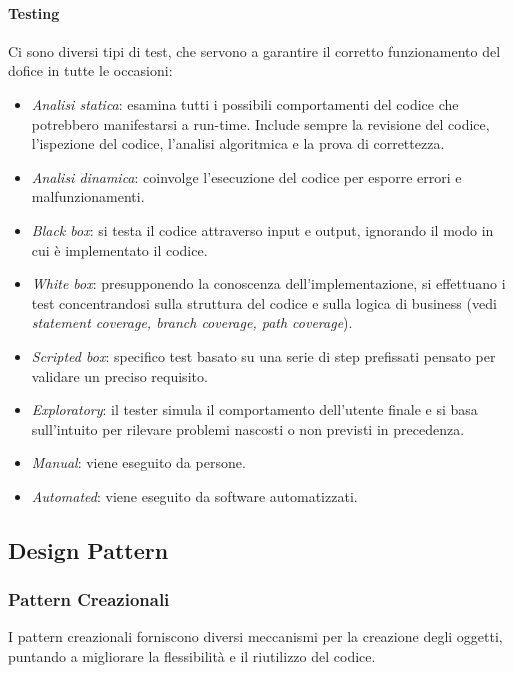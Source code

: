 \documentclass{article}
\begin{document}
        \paragraph{Testing} Ci sono diversi tipi di test, che servono a garantire il  corretto funzionamento del dofice in tutte le occasioni:
            \begin{itemize}
                    \item \textit{Analisi statica}: esamina tutti i possibili comportamenti del codice che potrebbero manifestarsi a run-time. Include sempre la revisione del codice, l'ispezione del codice, l'analisi algoritmica e la prova di correttezza.
                    \item \textit{Analisi dinamica}: coinvolge l'esecuzione del codice per esporre errori e malfunzionamenti.
                    \item \textit{Black box}: si testa il codice attraverso input e output, ignorando il modo in cui è implementato il codice.
                    \item \textit{White box}: presupponendo la conoscenza dell'implementazione, si effettuano i test concentrandosi sulla struttura del codice e sulla logica di business (vedi \textit{statement coverage, branch coverage, path coverage}). 
                    \item \textit{Scripted box}: specifico test basato su una serie di step prefissati pensato per validare un preciso requisito.
                    \item \textit{Exploratory}: il tester simula il comportamento dell'utente finale e si basa sull'intuito per rilevare problemi nascosti o non previsti in precedenza.
                    \item \textit{Manual}: viene eseguito da persone.
                    \item \textit{Automated}: viene eseguito da software automatizzati.
                \end{itemize}

    \subsection{Design Pattern}
        \subsubsection{Pattern Creazionali}
            I pattern creazionali forniscono diversi meccanismi per la creazione degli oggetti, puntando a migliorare la flessibilità e il riutilizzo del codice.
\end{document}
